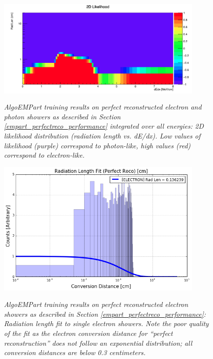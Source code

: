 \begin{figure}[ht!]
\centering
\includegraphics[width=0.9\textwidth]{Figures/EMPartTraining/mc_trained/2DRatio.png}\\
\caption{\textit{AlgoEMPart training results on perfect reconstructed electron and photon showers as described in Section \ref{empart_perfectreco_performance} integrated over all energies: 2D likelihood distribution (radiation length vs. dE/dx). Low values of likelihood (purple) correspond to photon-like, high values (red) correspond to electron-like.}}
\label{empart_perfectreco_performance_fig1}
\end{figure}


\begin{figure}[ht!]
\centering
\includegraphics[width=0.9\textwidth]{Figures/EMPartTraining/mc_trained/RadLength_Selected_e.png}\\
\caption{\textit{AlgoEMPart training results on perfect reconstructed electron showers as described in Section \ref{empart_perfectreco_performance}: Radiation length fit to single electron showers. Note the poor quality of the fit as the electron conversion distance for ``perfect reconstruction'' does not follow an exponential distribution; all conversion distances are below 0.3 centimeters.}}
\label{empart_perfectreco_performance_fig6}
\end{figure}

